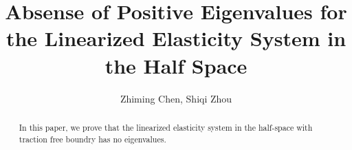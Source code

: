 \documentclass[12pt]{iopart}
\begin{document}

\def\debproof{\noindent {\bf Proof.} }
\def\finproof{\hfill {\small $\Box$} \\}
\makeatletter %
\makeatother  %
\renewcommand\theequation{{\thesection}.{\arabic{equation}}}

\title[]{Absense of Positive Eigenvalues for the Linearized Elasticity System in the Half Space}
\author{ Zhiming Chen, Shiqi Zhou }
\address{LSEC, Institute of Computational Mathematics, Academy of
	Mathematics and Systems Science, Chinese Academy of Sciences,
	Beijing 100190, China}

\begin{abstract}
	In this paper, we prove that the linearized elasticity system in the half-space with traction free boundry has no eigenvalues. 
\end{abstract}
\maketitle
\newcommand{\eps}{\varepsilon}
\newcommand{\RR}{\mathcal{R}}
\newtheorem{lem}{Lemma}[section]
\newtheorem{prop}{Proposition}[section]
\newtheorem{cor}{Corollary}[section]
\newtheorem{thm}{Theorem}[section]
\newtheorem{rem}{Remark}[section]
\newtheorem{alg}{Algorithm}[section]
\newtheorem{assum}{Assumption}[section]
\newtheorem{definition}{Definition}[section]


\newcommand{\MyRoman}[1]{\rm\setcounter{RomanNumber}{#1}\Roman{RomanNumber}}
\end{document}
